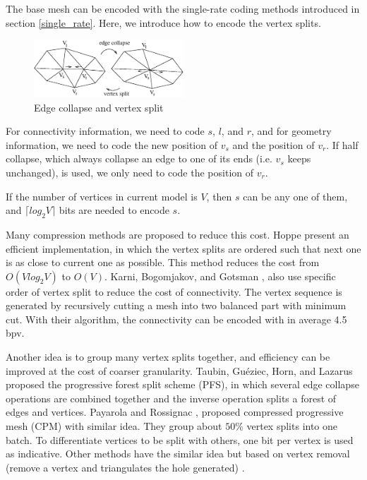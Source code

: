     The base mesh can be encoded with the single-rate coding methods
    introduced in section \ref{single_rate}. Here, we introduce
    how to encode the vertex splits. 
\begin{figure}
\centering
\includegraphics[width=0.5\textwidth]{split2.eps}
\caption{Edge collapse and vertex split}\label{split2}
\end{figure}
    For connectivity
    information, we need to code $s$, $l$, and $r$, and for geometry
    information, we need to code the new position of $v_{s}$ and the
    position of $v_{r}$. If half collapse, which always collapse an
    edge to one of its ends (i.e. $v_{s}$ keeps unchanged), is used, 
    we only need to code the position of $v_r$. 
    
    If the number of vertices in current model is
    $V$, then $s$ can be any one of them, 
    and ${\lceil}log_{2}V{\rceil}$ bits are needed to encode $s$. 
    
    Many compression methods are proposed to reduce this cost.
    Hoppe \cite{efficient:hoppe} present an efficient implementation,
    in which the vertex splits are ordered such that next one
    is as close to current one as possible. This method reduces the cost
    from $O(Vlog_{2}V)$ to $O(V)$.
    Karni, Bogomjakov, and Gotsman \cite{602153}, 
    also use specific order of vertex split to reduce the cost of connectivity. 
    The vertex sequence is generated by recursively cutting a mesh into two
    balanced part with minimum cut. With their algorithm, the connectivity can
    be encoded with in average 4.5 bpv. 

    Another idea is to group many vertex splits together, 
    and efficiency can be improved at the cost of coarser granularity. 
    Taubin, Gu\'{e}ziec, Horn, and Lazarus \cite{280834} proposed the
    progressive forest split scheme (PFS), in which several edge
    collapse operations are combined together and the inverse operation splits a
    forest of edges and vertices. 
    Payarola and Rossignac \cite{614450}, 
    proposed compressed progressive mesh (CPM)\label{cpm} with similar
    idea. They group about $50\%$ vertex splits into one batch. To
    differentiate vertices to be split with others, one bit per vertex
    is used as indicative. 
    Other methods have the similar idea
    but based on vertex removal (remove a vertex and triangulates the hole
    generated) \cite{319358}. 


